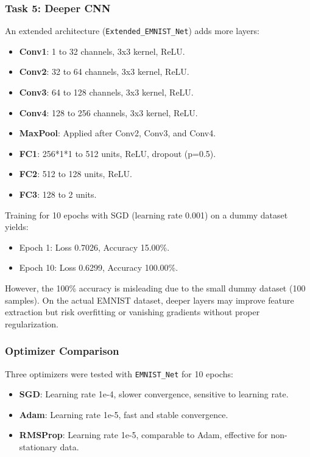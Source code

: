\documentclass{article}
\begin{document}
\subsubsection{Task 5: Deeper CNN}
An extended architecture (\texttt{Extended\_EMNIST\_Net}) adds more layers:
\begin{itemize}
    \item \textbf{Conv1}: 1 to 32 channels, 3x3 kernel, ReLU.
    \item \textbf{Conv2}: 32 to 64 channels, 3x3 kernel, ReLU.
    \item \textbf{Conv3}: 64 to 128 channels, 3x3 kernel, ReLU.
    \item \textbf{Conv4}: 128 to 256 channels, 3x3 kernel, ReLU.
    \item \textbf{MaxPool}: Applied after Conv2, Conv3, and Conv4.
    \item \textbf{FC1}: 256*1*1 to 512 units, ReLU, dropout (p=0.5).
    \item \textbf{FC2}: 512 to 128 units, ReLU.
    \item \textbf{FC3}: 128 to 2 units.
\end{itemize}

Training for 10 epochs with SGD (learning rate 0.001) on a dummy dataset yields:
\begin{itemize}
    \item Epoch 1: Loss 0.7026, Accuracy 15.00\%.
    \item Epoch 10: Loss 0.6299, Accuracy 100.00\%.
\end{itemize}

However, the 100\% accuracy is misleading due to the small dummy dataset (100 samples). On the actual EMNIST dataset, deeper layers may improve feature extraction but risk overfitting or vanishing gradients without proper regularization.

\subsubsection{Optimizer Comparison}
Three optimizers were tested with \texttt{EMNIST\_Net} for 10 epochs:
\begin{itemize}
    \item \textbf{SGD}: Learning rate 1e-4, slower convergence, sensitive to learning rate.
    \item \textbf{Adam}: Learning rate 1e-5, fast and stable convergence.
    \item \textbf{RMSProp}: Learning rate 1e-5, comparable to Adam, effective for non-stationary data.
\end{itemize}
\end{document}
